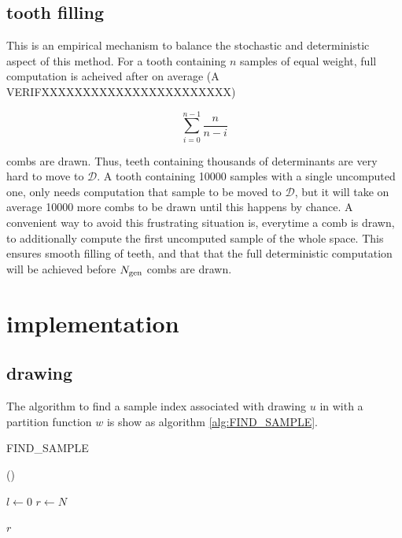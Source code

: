 \documentclass[./thesis.tex]{subfiles}
\begin{document}
\subsection*{tooth filling}

This is an empirical mechanism to balance the stochastic and deterministic aspect of this method. For a tooth containing $n$ samples of equal weight, full computation is acheived after on average (A VERIFXXXXXXXXXXXXXXXXXXXXXXX)

\begin{equation}
\sum_{i=0}^{n-1} \frac{n}{n-i}
\end{equation}

combs are drawn. Thus, teeth containing thousands of determinants are very hard to move to $\mathcal{D}$. A tooth containing 10000 samples with a single uncomputed one, only needs computation that sample to be moved to $\mathcal{D}$, but it will take on average 10000 more combs to be drawn until this happens by chance.
A convenient way to avoid this frustrating situation is, everytime a comb is drawn, to additionally compute the first uncomputed sample of the whole space. This ensures smooth filling of teeth, and that that the full deterministic computation will be achieved before ${N_\text{gen}}$ combs are drawn.

\section{implementation}


\subsection{drawing}

The algorithm to find a sample index associated with drawing $u$ in with a partition function $w$ is show as algorithm \ref{alg:FIND_SAMPLE}.

\begin{algorithm}
\label{alg:FIND_SAMPLE}
\caption{FIND\_SAMPLE}
	
	\Fn(){}{
		
		$l \gets 0$ \;
		$r \gets N$ \;
		
		\KwRet $r$ \;
	}
\end{algorithm}
\end{document}
